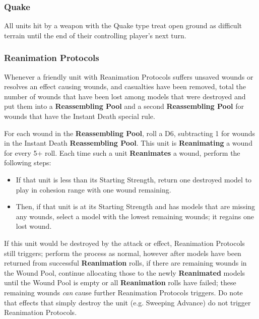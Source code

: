 \begin{multicols}{2}
\subsubsection{Quake} \label{Quake}

All units hit by a weapon with the Quake type treat open ground as difficult terrain until the end of their controlling player's next turn.

\subsubsection{Reanimation Protocols} \label{Reanimation Protocols}

Whenever a friendly unit with Reanimation Protocols suffers unsaved wounds or resolves an effect causing wounds, and casualties have been removed, total the number of wounds that have been lost among models that were destroyed and put them into a \textbf{Reassembling Pool} and a second \textbf{Reassembling Pool} for wounds that have the Instant Death special rule.

For each wound in the \textbf{Reassembling Pool}, roll a D6, subtracting 1 for wounds in the Instant Death \textbf{Reassembling Pool}. This unit is \textbf{Reanimating} a wound for every 5+ roll. Each time such a unit \textbf{Reanimates} a wound, perform the following steps:

\begin{itemize}
	\itemsep 0pt
	\item If that unit is less than its Starting Strength, return one destroyed model to play in cohesion range with one wound remaining.
	\item Then, if that unit is at its Starting Strength and has models that are missing any wounds, select a model with the lowest remaining wounds; it regains one lost wound.
\end{itemize}

If this unit would be destroyed by the attack or effect, Reanimation Protocols still triggers; perform the process as normal, however after models have been returned from successful \textbf{Reanimation} rolls, if there are remaining wounds in the Wound Pool, continue allocating those to the newly \textbf{Reanimated} models until the Wound Pool is empty or all \textbf{Reanimation} rolls have failed; these remaining wounds \textit{can} cause further Reanimation Protocols triggers. Do note that effects that simply destroy the unit (e.g. Sweeping Advance) do not trigger Reanimation Protocols.


\end{multicols}
